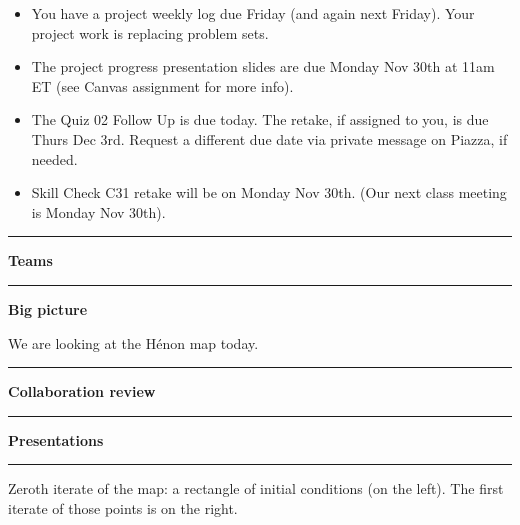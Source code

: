 \documentclass[12pt,letterpaper,noanswers]{exam}
\begin{document}
 \pdfpageheight 11in 
  \pdfpagewidth 8.5in

\noindent 




\begin{itemize}
\itemsep0em
\item You have a project weekly log due Friday (and again next Friday).  Your project work is replacing problem sets.
\item The project progress presentation slides are due Monday Nov 30th at 11am ET (see Canvas assignment for more info).
\item The Quiz 02 Follow Up is due today.  The retake, if assigned to you, is due Thurs Dec 3rd.  Request a different due date via private message on Piazza, if needed.
\item Skill Check C31 retake will be on Monday Nov 30th.  (Our next class meeting is Monday Nov 30th).
\end{itemize}

\hrule
\vspace{0.2cm}



\noindent\textbf{Teams}




\vspace{0.2cm}

\hrule
\vspace{0.2cm}


\noindent\textbf{Big picture}

We are looking at the H\'enon map today.

\vspace{0.2cm}
\hrule
\vspace{0.2cm}
\noindent\textbf{Collaboration review}

\vspace{0.2cm}
\hrule
\vspace{0.2cm}

\noindent\textbf{Presentations}


\vspace{0.2cm}
\hrule
\vspace{0.2cm}
Zeroth iterate of the map: a rectangle of initial conditions (on the left).  The first iterate of those points is on the right.
\end{document}
